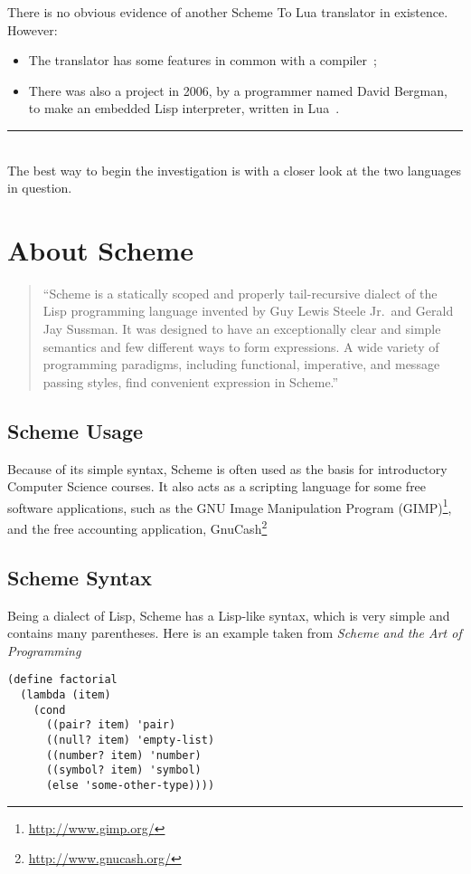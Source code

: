 There is no obvious evidence of another Scheme To Lua translator in existence.
However:
\begin{itemize}
\item The translator has some features in common with a
compiler~\cite{compiler};
\item There was also a project in 2006, by a programmer named David
Bergman, to make an embedded Lisp interpreter, written in Lua~\cite{lualisp}.
\\[5mm]
\end{itemize}

\hrule \hfill \\[5mm]

\noindent The best way to begin the investigation is with a closer look at the
two languages in question.

\section{About Scheme}

\begin{quotation}
``Scheme is a statically scoped and properly tail-recursive
dialect of the Lisp programming language invented by Guy Lewis Steele Jr.\ and
Gerald Jay Sussman. It was designed to have an exceptionally clear and simple
semantics and few different ways to form expressions. A wide variety of
programming paradigms, including functional, imperative, and message passing
styles, find convenient expression in Scheme.''~\cite{r6rs}
\end{quotation}

\subsection{Scheme Usage}

Because of its simple syntax, Scheme is often used as the basis for introductory
Computer Science courses. It also acts as a scripting language for some free
software applications, such as the GNU Image Manipulation Program
(GIMP)\footnote{\url{http://www.gimp.org/}}, and the free accounting
application, GnuCash\footnote{\url{http://www.gnucash.org/}}

\subsection{Scheme Syntax}

Being a dialect of Lisp, Scheme has a Lisp-like syntax, which is very simple and
contains many parentheses. Here is an example taken from \emph{Scheme and the
Art of Programming}~\cite[p.40]{schemebook}
\begin{framed}
\begin{verbatim}
(define factorial
  (lambda (item)
    (cond
      ((pair? item) 'pair)
      ((null? item) 'empty-list)
      ((number? item) 'number)
      ((symbol? item) 'symbol)
      (else 'some-other-type))))
\end{verbatim}
\end{framed}


